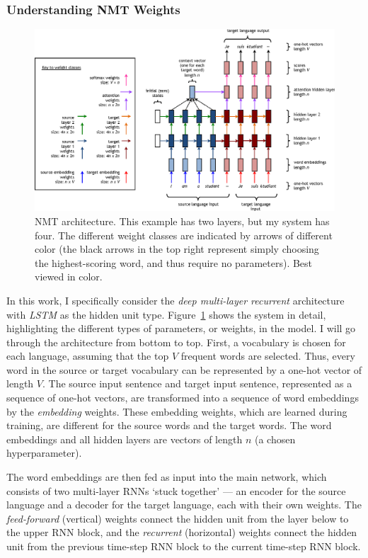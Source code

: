\subsubsection{Understanding NMT Weights}
\label{subsubsec:lstm}
\begin{figure}[t]
\centering
\includegraphics[width=\textwidth]{img/6-2_nmt_complex} %
\caption[Weights of NMT architecture]{NMT architecture. This example has two layers, but my system has four. The different weight classes are indicated by arrows of different color (the black arrows in the top right represent simply choosing the highest-scoring word, and thus require no parameters).
Best viewed in color.
}
\label{fig:nmt_complex}
\end{figure}

In this work, I specifically consider the {\it deep multi-layer recurrent} architecture with {\it
LSTM} as the hidden unit type.
Figure~\ref{fig:nmt_complex} shows the system in detail,
highlighting the different types of parameters, or weights, in the model.
I will go through the architecture from bottom to top.
First, a vocabulary is chosen for each language, assuming that the top $V$ frequent
words are selected.
Thus, every word in the source or target vocabulary can be represented by a one-hot vector of length $V$.
The source input sentence and target input sentence, represented as a sequence
of one-hot vectors, are transformed into a sequence of word embeddings by the
\emph{embedding} weights. 
These embedding weights, which are learned during training, are different for the source words and the target words.
The word embeddings and all hidden layers are vectors of length $n$ (a chosen hyperparameter).

The word embeddings are then fed as input into the main network, which consists
of two multi-layer RNNs `stuck together' --- an encoder for the source
language and a decoder for the target language, each with their own
weights. 
The \emph{feed-forward} (vertical) weights connect
the hidden unit from the layer below to the upper RNN block, and the
\emph{recurrent} (horizontal) weights connect the hidden unit from the previous
time-step RNN block to the current time-step RNN block.

